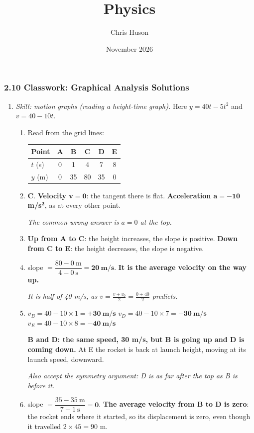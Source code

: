 \documentclass[12pt, twoside]{article}
\title{Physics}
\author{Chris Huson}
\date{November 2026}
\begin{document}
\subsubsection*{2.10 Classwork: Graphical Analysis Solutions}

\begin{enumerate}[itemsep=0.5cm]

\item \emph{Skill: motion graphs (reading a height-time graph).} Here
  $y = 40t - 5t^2$ and $v = 40 - 10t$.
  \begin{enumerate}[itemsep=0.3cm]
    \item Read from the grid lines:

      {\renewcommand{\arraystretch}{1.4}%
      \begin{tabular}{| l | c | c | c | c | c |}
        \hline
        Point & A & B & C & D & E \\ \hline
        $t$ (s) & 0 & 1 & 4 & 7 & 8 \\ \hline
        $y$ (m) & 0 & 35 & 80 & 35 & 0 \\ \hline
      \end{tabular}}
    \item \textbf{C}. \textbf{Velocity $\mathbf{v = 0}$}: the tangent there is
      flat. \textbf{Acceleration $\mathbf{a = -10}$ m/s$^\mathbf{2}$}, as at every
      other point.

      \emph{The common wrong answer is $a = 0$ at the top.}
    \item \textbf{Up from A to C}: the height increases, the slope is positive.
      \textbf{Down from C to E}: the height decreases, the slope is negative.
    \item slope $= \dfrac{80 - 0~\text{m}}{4 - 0~\text{s}} =
      \mathbf{20~\textbf{m/s}}$. \textbf{It is the average velocity on the way up.}

      \emph{It is half of 40 m/s, as $\bar{v} = \frac{v + v_0}{2} = \frac{0 +
      40}{2}$ predicts.}
    \item $v_B = 40 - 10 \times 1 = \mathbf{+30~\textbf{m/s}}$ \qquad
      $v_D = 40 - 10 \times 7 = \mathbf{-30~\textbf{m/s}}$ \qquad
      $v_E = 40 - 10 \times 8 = \mathbf{-40~\textbf{m/s}}$

      \textbf{B and D: the same speed, 30 m/s, but B is going up and D is coming
      down.} At E the rocket is back at launch height, moving at its launch speed,
      downward.

      \emph{Also accept the symmetry argument: D is as far after the top as B is
      before it.}
    \item slope $= \dfrac{35 - 35~\text{m}}{7 - 1~\text{s}} = \mathbf{0}$.
      \textbf{The average velocity from B to D is zero}: the rocket ends where it
      started, so its displacement is zero, even though it travelled
      $2 \times 45 = 90$ m.
  \end{enumerate}


\end{enumerate}
\end{document}

